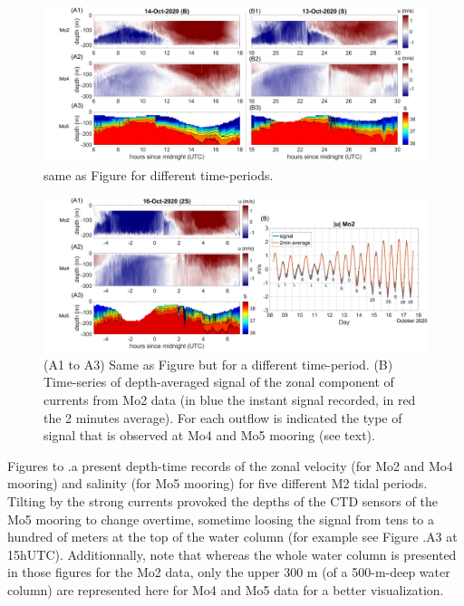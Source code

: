 \begin{figure}[!h]
 \includegraphics[width=\textwidth]{./GBR3D/US_moorings2.png}
 \caption [Time-series of mooring data from Mo2, Mo4 and Mo5]{same as Figure  for different time-periods.}
 \label{fig_moor_US2}
\end{figure}

\begin{figure}[!h]
 \includegraphics[width=\textwidth]{./GBR3D/US_moorings3.png}
 \caption [(A)Time-series of mooring data from Mo2, Mo4 and Mo5. (B) Depth-averaged signal of the zonal component of currents at Mo2 with type of signal observed at Mo4 and Mo5 after each outflow.]{(A1 to A3) Same as Figure  but for a different time-period. (B) Time-series of depth-averaged signal of the zonal component of currents from Mo2 data (in blue the instant signal recorded, in red the 2 minutes average). For each outflow is indicated the type of signal that is observed at Mo4 and Mo5 mooring (see text).}
 \label{fig_moor_US3}
\end{figure}

Figures  to .a present depth-time records of the zonal velocity (for Mo2 and Mo4 mooring) and salinity (for Mo5 mooring) for five different M2 tidal periods. Tilting by the strong currents provoked the depths of the CTD sensors of the Mo5 mooring to change overtime, sometime loosing the signal from tens to a hundred of meters at the top of the water column (for example see Figure .A3 at 15hUTC). Additionnally, note that whereas the whole water column is presented in those figures for the Mo2 data, only the upper 300 m (of a 500-m-deep water column) are represented here for Mo4 and Mo5 data for a better visualization.

